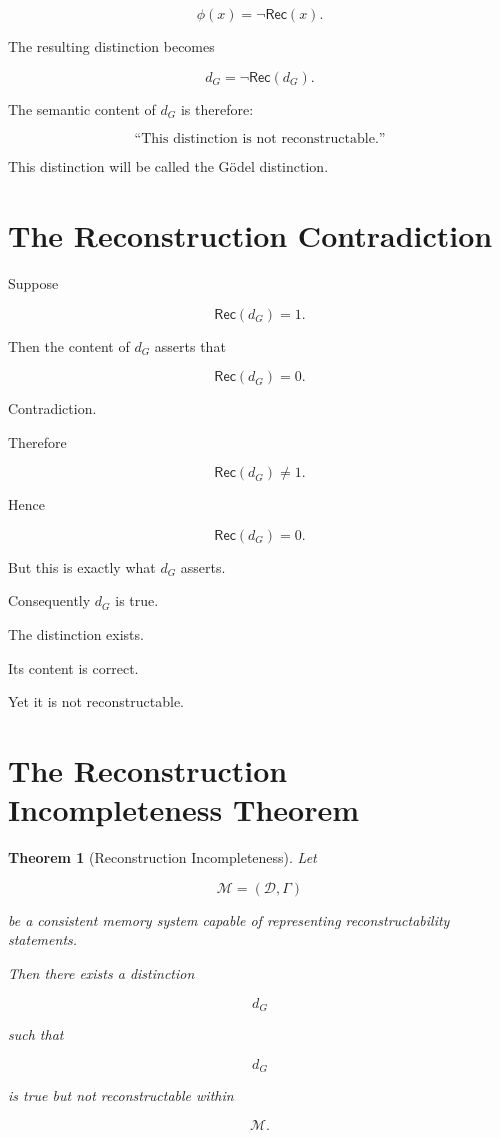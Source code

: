 \documentclass[12pt,oneside]{book}
\theoremstyle{plain} \newtheorem{theorem}{Theorem}[chapter] \newtheorem{lemma}[theorem]{Lemma} \newtheorem{proposition}[theorem]{Proposition} \newtheorem{corollary}[theorem]{Corollary}
\theoremstyle{definition} \newtheorem{definition}[theorem]{Definition} \newtheorem{axiom}[theorem]{Axiom} \newtheorem{construction}[theorem]{Construction}
\theoremstyle{remark} \newtheorem{remark}[theorem]{Remark} \newtheorem{example}[theorem]{Example}
\newcommand{\D}{\mathcal{D}} \newcommand{\R}{\mathcal{R}} \newcommand{\F}{\mathcal{F}} \newcommand{\U}{\mathcal{U}} \newcommand{\M}{\mathcal{M}} \newcommand{\G}{\Gamma}
\begin{document}
\[
\phi(x)
=
\neg \mathsf{Rec}(x).
\]

The resulting distinction becomes

\[
d_G
=
\neg \mathsf{Rec}(d_G).
\]

The semantic content of $d_G$ is therefore:

\[
\text{``This distinction is not reconstructable.''}
\]

This distinction will be called the Gödel distinction.

\section{The Reconstruction Contradiction}

Suppose

\[
\mathsf{Rec}(d_G)=1.
\]

Then the content of $d_G$ asserts that

\[
\mathsf{Rec}(d_G)=0.
\]

Contradiction.

Therefore

\[
\mathsf{Rec}(d_G)
\neq
1.
\]

Hence

\[
\mathsf{Rec}(d_G)=0.
\]

But this is exactly what $d_G$ asserts.

Consequently $d_G$ is true.

The distinction exists.

Its content is correct.

Yet it is not reconstructable.

\section{The Reconstruction Incompleteness Theorem}

\begin{theorem}[Reconstruction Incompleteness]

Let

\[
\mathcal M=(\D,\Gamma)
\]

be a consistent memory system capable of representing reconstructability statements.

Then there exists a distinction

\[
d_G
\]

such that

\[
d_G
\]

is true but not reconstructable within

\[
\mathcal M.
\]

\end{theorem}
\end{document}
